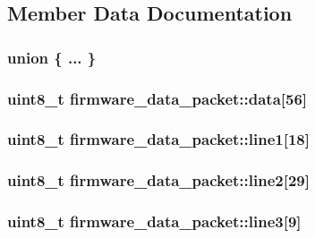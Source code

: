 \subsection{Member Data Documentation}
\hypertarget{structfirmware__data__packet_a251e81785646ac043c47035095aaea9d}{\subsubsection[{"@25}]{\setlength{\rightskip}{0pt plus 5cm}union \{ ... \} }}\label{structfirmware__data__packet_a251e81785646ac043c47035095aaea9d}
\hypertarget{structfirmware__data__packet_a224c1a6c9d1cf15546679bd74d793f2e}{
\subsubsection[{data}]{\setlength{\rightskip}{0pt plus 5cm}uint8\-\_\-t firmware\-\_\-data\-\_\-packet\-::data\mbox{[}56\mbox{]}}}\label{structfirmware__data__packet_a224c1a6c9d1cf15546679bd74d793f2e}
\hypertarget{structfirmware__data__packet_a47aec40c2fc17de6c7a60eba35776e7d}{
\subsubsection[{line1}]{\setlength{\rightskip}{0pt plus 5cm}uint8\-\_\-t firmware\-\_\-data\-\_\-packet\-::line1\mbox{[}18\mbox{]}}}\label{structfirmware__data__packet_a47aec40c2fc17de6c7a60eba35776e7d}
\hypertarget{structfirmware__data__packet_ac9cd94ddddd471656eb5ec03914ffc1c}{
\subsubsection[{line2}]{\setlength{\rightskip}{0pt plus 5cm}uint8\-\_\-t firmware\-\_\-data\-\_\-packet\-::line2\mbox{[}29\mbox{]}}}\label{structfirmware__data__packet_ac9cd94ddddd471656eb5ec03914ffc1c}
\hypertarget{structfirmware__data__packet_a943cd8ef900bcfffba560cd718c2f844}{
\subsubsection[{line3}]{\setlength{\rightskip}{0pt plus 5cm}uint8\-\_\-t firmware\-\_\-data\-\_\-packet\-::line3\mbox{[}9\mbox{]}}}\label{structfirmware__data__packet_a943cd8ef900bcfffba560cd718c2f844}


